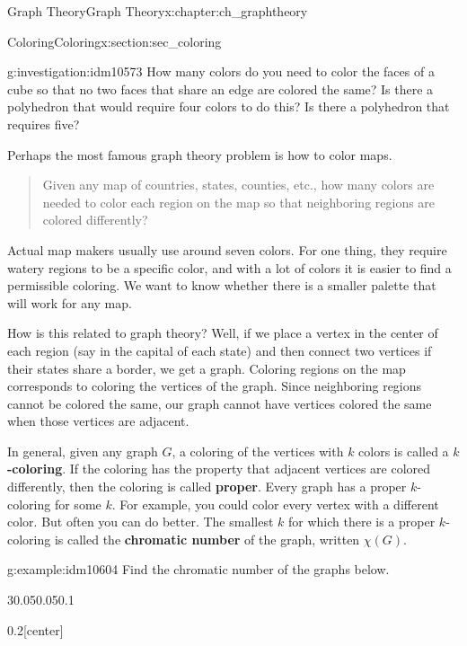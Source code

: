\documentclass[oneside,10pt,]{book}
\newcommand{\terminology}[1]{\textbf{#1}}
\numberwithin{equation}{chapter}
\newcommand{\vtx}[2]{node[fill,circle,inner sep=0pt, minimum size=4pt,label=#1:#2]{}}
\renewcommand{\v}{\vtx{above}{}}
\begin{document}
\begin{chapterptx}{Graph Theory}{}{Graph Theory}{}{}{x:chapter:ch_graphtheory}
\begin{sectionptx}{Coloring}{}{Coloring}{}{}{x:section:sec_coloring}
\begin{introduction}{}
\begin{investigation}{}{g:investigation:idm10573}
How many colors do you need to color the faces of a cube so that no two faces that share an edge are colored the same?  Is there a polyhedron that would require four colors to do this?  Is there a polyhedron that requires five?%
\end{investigation}
Perhaps the most famous graph theory problem is how to color maps.%
\begin{quote}%
Given any map of countries, states, counties, etc., how many colors are needed to color each region on the map so that neighboring regions are colored differently?%
\end{quote}
Actual map makers usually use around seven colors. For one thing, they require watery regions to be a specific color, and with a lot of colors it is easier to find a permissible coloring. We want to know whether there is a smaller palette that will work for any map.%
\par
How is this related to graph theory? Well, if we place a vertex in the center of each region (say in the capital of each state) and then connect two vertices if their states share a border, we get a graph. Coloring regions on the map corresponds to coloring the vertices of the graph. Since neighboring regions cannot be colored the same, our graph cannot have vertices colored the same when those vertices are adjacent.%
\par
In general, given any graph \(G\), a coloring of the vertices with \(k\) colors is called a \terminology{\(k\)-coloring}. If the coloring has the property that adjacent vertices are colored differently, then the coloring is called \terminology{proper}. Every graph has a proper \(k\)-coloring for some \(k\). For example, you could color every vertex with a different color. But often you can do better. The smallest \(k\) for which there is a proper \(k\)-coloring is called the \terminology{chromatic number} of the graph, written \(\chi(G)\)\label{g:notation:idm10600}.%
\begin{example}{}{g:example:idm10604}%
Find the chromatic number of the graphs below.%
\begin{sidebyside}{3}{0.05}{0.05}{0.1}%
\begin{sbspanel}{0.2}[center]%
\resizebox{\linewidth}{!}{%
\begin{tikzpicture}
	      \foreach \x in {0,...,6}
	      \draw  (\x*60:1) \v -- (\x*60+60:1) -- (\x*60+180:1) -- cycle;
	    \end{tikzpicture}
}%
\end{sbspanel}%

\end{sidebyside}
\end{example}
\end{introduction}
\end{sectionptx}
\end{chapterptx}
\end{document}
